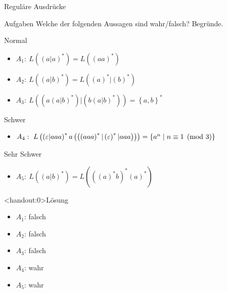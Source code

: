 {
\begin{frame}{Reguläre Ausdrücke}
    \begin{alertblock}{Aufgaben}
        Welche der folgenden Aussagen sind wahr/falsch? Begründe.
    \end{alertblock}
    \begin{block}{Normal}
        \begin{itemize}
            \item $A_1:\ L\left(\left(a|a\right)^*\right) = L\left(\left(aa\right)^*\right)$
            \item $A_2:\ L\left(\left(a|b\right)^*\right) = L\left(\left(a\right)^*|\left(b\right)^*\right)$
            \item $A_3:\
                      L\left(\left(a\left(a|b\right)^*\right)|\left(b\left(a|b\right)^*\right)\right) = \left\{a,b\right\}^*$
        \end{itemize}
    \end{block}
    \begin{block}{Schwer}
        \begin{itemize}
            \item $A_4:\ L\left(\left(\varepsilon | aaa\right)^*a\left(\left(\left(aaa\right)^* | \left(\varepsilon\right)^*|aaa\right)\right)\right) = \left\{a^{n} \mid n \equiv 1 \pmod 3\right\}$

        \end{itemize}
    \end{block}
    \begin{block}{Sehr Schwer}
        \begin{itemize}
            \item $A_5:\
                      L\left(\left(a|b\right)^*\right) = L\left(\left(\left(a\right)^*b\right)^*\left(a\right)^*\right)$
        \end{itemize}
    \end{block}
\end{frame}
}

{
\begin{frame}<handout:0>{Lösung}
    \begin{itemize}[<+- | alert@+>]
        \item $A_1$: falsch
        \item $A_2$: falsch
        \item $A_3$: falsch
        \item $A_4$: wahr
        \item $A_5$: wahr
    \end{itemize}
\end{frame}
}

